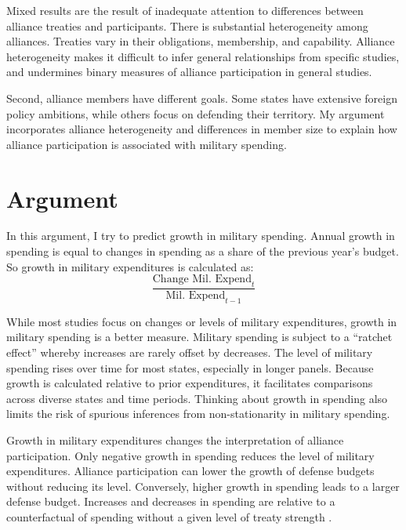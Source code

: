 \documentclass[12pt]{article}
\begin{document}
Mixed results are the result of inadequate attention to differences between alliance treaties and participants.
There is substantial heterogeneity among alliances.
Treaties vary in their obligations, membership, and capability. 
Alliance heterogeneity makes it difficult to infer general relationships from specific studies, and undermines binary measures of alliance participation in general studies. 
 

Second, alliance members have different goals.
Some states have extensive foreign policy ambitions, while others focus on defending their territory. 
My argument incorporates alliance heterogeneity and differences in member size to explain how alliance participation is associated with military spending. 



\section{Argument}

In this argument, I try to predict growth in military spending. 
Annual growth in spending is equal to changes in spending as a share of the previous year's budget. 
So growth in military expenditures is calculated as:
\begin{equation}
\frac{ \mbox{Change Mil. Expend}_t }{ \mbox{Mil. Expend}_{t-1} }
\end{equation} 


While most studies focus on changes or levels of military expenditures, growth in military spending is a better measure. 
Military spending is subject to a ``ratchet effect'' whereby increases are rarely offset by decreases. 
The level of military spending rises over time for most states, especially in longer panels. 
Because growth is calculated relative to prior expenditures, it facilitates comparisons across diverse states and time periods. 
Thinking about growth in spending also limits the risk of spurious inferences from non-stationarity in military spending. 


Growth in military expenditures changes the interpretation of alliance participation. 
Only negative growth in spending reduces the level of military expenditures. 
Alliance participation can lower the growth of defense budgets without reducing its level. 
Conversely, higher growth in spending leads to a larger defense budget. 
Increases and decreases in spending are relative to a counterfactual of spending without a given level of treaty strength \citep{Fearon1991}. 
\end{document}
